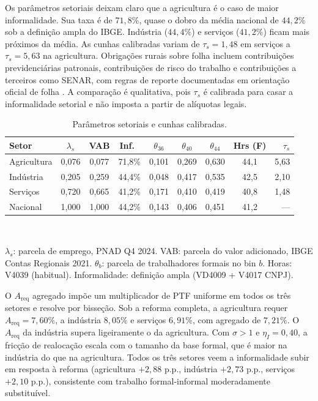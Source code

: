 \documentclass[12pt,a4paper]{article}
\begin{document}
Os par\^ametros setoriais deixam claro que a agricultura \'e o caso de maior informalidade. Sua taxa \'e de $71{,}8\%$, quase o dobro da m\'edia nacional de $44{,}2\%$ sob a defini\c{c}\~ao ampla do IBGE. Ind\'ustria ($44{,}4\%$) e servi\c{c}os ($41{,}2\%$) ficam mais pr\'oximos da m\'edia. As cunhas calibradas variam de $\tau_s=1{,}48$ em servi\c{c}os a $\tau_s=5{,}63$ na agricultura. Obriga\c{c}\~oes rurais sobre folha incluem contribui\c{c}\~oes previdenci\'arias patronais, contribui\c{c}\~oes de risco do trabalho e contribui\c{c}\~oes a terceiros como SENAR, com regras de reporte documentadas em orienta\c{c}\~ao oficial de folha \citep{BrasilLei8212,ReceitaESocialRural2021}. A compara\c{c}\~ao \'e qualitativa, pois $\tau_s$ \'e calibrada para casar a informalidade setorial e n\~ao imposta a partir de al\'iquotas legais.

\begin{table}[htbp]
\centering
\caption{Par\^ametros setoriais e cunhas calibradas.}\label{tab:sectoral_params}
\small
\begin{tabular}{lcccccccr}
\hline\hline
Setor & $\lambda_s$ & VAB & Inf.\ & $\theta_{36}$ & $\theta_{40}$ & $\theta_{44}$ & Hrs (F) & $\tau_s$ \\
\hline
Agricultura & 0{,}076 & 0{,}077 & 71{,}8\% & 0{,}101 & 0{,}269 & 0{,}630 & 44{,}1 & 5{,}63 \\
Ind\'ustria & 0{,}205 & 0{,}259 & 44{,}4\% & 0{,}048 & 0{,}417 & 0{,}535 & 42{,}5 &  2{,}10 \\
Servi\c{c}os & 0{,}720 & 0{,}665 & 41{,}2\% & 0{,}171 & 0{,}410 & 0{,}419 & 40{,}8 &  1{,}48 \\
\hline
Nacional    & 1{,}000 & 1{,}000 & 44{,}2\% & 0{,}143 & 0{,}406 & 0{,}451 & 41{,}2 & --- \\
\hline\hline
\end{tabular}
\\[2pt]
\begin{minipage}{0.95\textwidth}
\justifying
{\footnotesize $\lambda_s$: parcela de emprego, PNAD Q4 2024. VAB: parcela do valor adicionado, IBGE Contas Regionais 2021. $\theta_b$: parcela de trabalhadores formais no bin $b$. Horas: V4039 (habitual). Informalidade: defini\c{c}\~ao ampla (VD4009 + V4017 CNPJ).}
\end{minipage}
\end{table}

O $A_{\text{req}}$ agregado imp\~oe um multiplicador de PTF uniforme em todos os tr\^es setores e resolve por bisse\c{c}\~ao. Sob a reforma completa, a agricultura requer $A_{\text{req}}=7{,}60\%$, a ind\'ustria $8{,}05\%$ e servi\c{c}os $6{,}91\%$, com agregado de $7{,}21\%$. O $A_{\text{req}}$ da ind\'ustria supera ligeiramente o da agricultura. Com $\sigma>1$ e $\eta_I=0{,}40$, a fric\c{c}\~ao de realoca\c{c}\~ao escala com o tamanho da base formal, que \'e maior na ind\'ustria do que na agricultura. Todos os tr\^es setores veem a informalidade subir em resposta \`a reforma (agricultura $+2{,}88$ p.p., ind\'ustria $+2{,}73$ p.p., servi\c{c}os $+2{,}10$ p.p.), consistente com trabalho formal-informal moderadamente substitu\'ivel.
\end{document}
